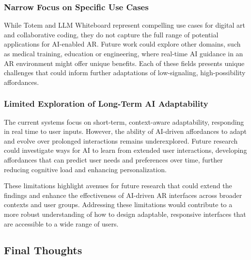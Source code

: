 \subsubsection{Narrow Focus on Specific Use Cases}
While Totem and LLM Whiteboard represent compelling use cases for digital art and collaborative coding, they do not capture the full range of potential applications for AI-enabled AR.
Future work could explore other domains, such as medical training, education or engineering, where real-time AI guidance in an AR environment might offer unique benefits.
Each of these fields presents unique challenges that could inform further adaptations of low-signaling, high-possibility affordances.

\subsubsection{Limited Exploration of Long-Term AI Adaptability}
The current systems focus on short-term, context-aware adaptability, responding in real time to user inputs.
However, the ability of AI-driven affordances to adapt and evolve over prolonged interactions remains underexplored.
Future research could investigate ways for AI to learn from extended user interactions, developing affordances that can predict user needs and preferences over time, further reducing cognitive load and enhancing personalization.

These limitations highlight avenues for future research that could extend the findings and enhance the effectiveness of AI-driven AR interfaces across broader contexts and user groups.
Addressing these limitations would contribute to a more robust understanding of how to design adaptable, responsive interfaces that are accessible to a wide range of users.

\subsection{Final Thoughts}




